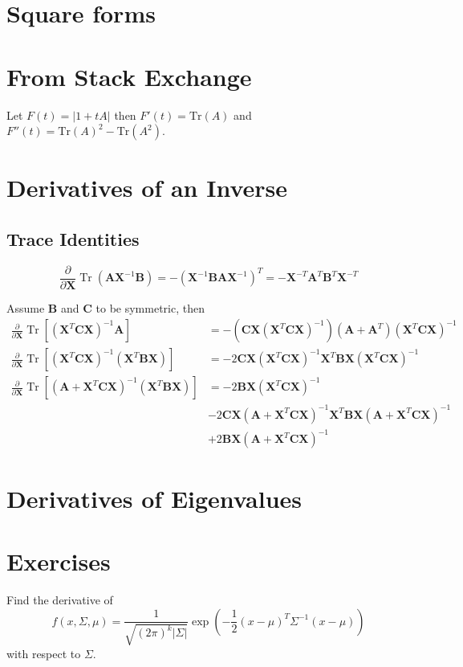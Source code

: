 \section{Square forms}
 
\section{From Stack Exchange}

Let $F(t)=|1+t A|$ then
$F'(t) = \mathrm{Tr}(A)$ and
$F''(t) = \mathrm{Tr}(A)^2 - \mathrm{Tr}(A^2)$.

\section{Derivatives of an Inverse}


\subsection{Trace Identities}
$$
\frac{\partial}{\partial \mathbf{X}} \operatorname{Tr}\left(\mathbf{A} \mathbf{X}^{-1} \mathbf{B}\right)=-\left(\mathbf{X}^{-1} \mathbf{B} \mathbf{A} \mathbf{X}^{-1}\right)^T=-\mathbf{X}^{-T} \mathbf{A}^T \mathbf{B}^T \mathbf{X}^{-T}
$$

Assume $\mathbf{B}$ and $\mathbf{C}$ to be symmetric, then
$$
\begin{aligned}
\frac{\partial}{\partial \mathbf{X}} \operatorname{Tr}\left[\left(\mathbf{X}^T \mathbf{C X}\right)^{-1} \mathbf{A}\right] & =-\left(\mathbf{C X}\left(\mathbf{X}^T \mathbf{C X}\right)^{-1}\right)\left(\mathbf{A}+\mathbf{A}^T\right)\left(\mathbf{X}^T \mathbf{C X}\right)^{-1} \\
\frac{\partial}{\partial \mathbf{X}} \operatorname{Tr}\left[\left(\mathbf{X}^T \mathbf{C X}\right)^{-1}\left(\mathbf{X}^T \mathbf{B X}\right)\right] & =-2 \mathbf{C X}\left(\mathbf{X}^T \mathbf{C X}\right)^{-1} \mathbf{X}^T \mathbf{B X}\left(\mathbf{X}^T \mathbf{C X}\right)^{-1} \\
\frac{\partial}{\partial \mathbf{X}} \operatorname{Tr}\left[\left(\mathbf{A}+\mathbf{X}^T \mathbf{C X}\right)^{-1}\left(\mathbf{X}^T \mathbf{B X}\right)\right] & =-2 \mathbf{B X}\left(\mathbf{X}^T \mathbf{C X}\right)^{-1} \\
& -2 \mathbf{C X}\left(\mathbf{A}+\mathbf{X}^T \mathbf{C X}\right)^{-1} \mathbf{X}^T \mathbf{B X}\left(\mathbf{A}+\mathbf{X}^T \mathbf{C X}\right)^{-1} \\
& +2 \mathbf{B X}\left(\mathbf{A}+\mathbf{X}^T \mathbf{C X}\right)^{-1}
\end{aligned}
$$

\section{Derivatives of Eigenvalues}

\section{Exercises}
\begin{exercise}
   Find the derivative of
\[
   f(x,\Sigma,\mu) = \frac{1}{\sqrt{(2\pi)^k|\Sigma|}}
   \exp\left(-\frac12(x-\mu)^T \Sigma^{-1} (x-\mu)\right)
\]
   with respect to $\Sigma$.
\end{exercise}
